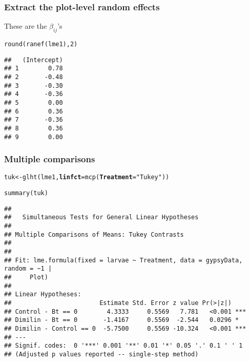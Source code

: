 \documentclass[color=usenames,dvipsnames]{beamer}\usepackage[]{graphicx}\usepackage[]{color}
\makeatletter
\newcommand{\hlnum}[1]{\textcolor[rgb]{0.69,0.494,0}{#1}}%
\newcommand{\hlstr}[1]{\textcolor[rgb]{0.749,0.012,0.012}{#1}}%
\newcommand{\hlstd}[1]{\textcolor[rgb]{0,0,0}{#1}}%
\newcommand{\hlkwb}[1]{\textcolor[rgb]{0,0.341,0.682}{#1}}%
\newcommand{\hlkwc}[1]{\textcolor[rgb]{0,0,0}{\textbf{#1}}}%
\newcommand{\hlkwd}[1]{\textcolor[rgb]{0.004,0.004,0.506}{#1}}%
\newenvironment{kframe}{%
 \def\at@end@of@kframe{}%
 \ifinner\ifhmode%
  \def\at@end@of@kframe{\end{minipage}}%
  \begin{minipage}{\columnwidth}%
 \fi\fi%
 \def\FrameCommand##1{\hskip\@totalleftmargin \hskip-\fboxsep
 \colorbox{shadecolor}{##1}\hskip-\fboxsep
     \hskip-\linewidth \hskip-\@totalleftmargin \hskip\columnwidth}%
 \MakeFramed {\advance\hsize-\width
   \@totalleftmargin\z@ \linewidth\hsize
   \@setminipage}}%
 {\par\unskip\endMakeFramed%
 \at@end@of@kframe}
\newenvironment{knitrout}{}{} %
\makeatother
\begin{document}
\begin{frame}[fragile]
  \frametitle{Extract the plot-level random effects}
  These are the $\beta_{ij}$'s
\begin{knitrout}
\color{fgcolor}\begin{kframe}
\begin{alltt}
\hlkwd{round}\hlstd{(}\hlkwd{ranef}\hlstd{(lme1),} \hlnum{2}\hlstd{)}
\end{alltt}
\begin{verbatim}
##   (Intercept)
## 1        0.78
## 2       -0.48
## 3       -0.30
## 4       -0.36
## 5        0.00
## 6        0.36
## 7       -0.36
## 8        0.36
## 9        0.00
\end{verbatim}
\end{kframe}
\end{knitrout}
\end{frame}



\begin{frame}[fragile]
  \frametitle{Multiple comparisons}
\begin{knitrout}\scriptsize
{}\color{fgcolor}\begin{kframe}
\begin{alltt}
\hlstd{tuk} \hlkwb{<-} \hlkwd{glht}\hlstd{(lme1,} \hlkwc{linfct}\hlstd{=}\hlkwd{mcp}\hlstd{(}\hlkwc{Treatment}\hlstd{=}\hlstr{"Tukey"}\hlstd{))}
\end{alltt}
\end{kframe}
\end{knitrout}
\pause
\begin{knitrout}\scriptsize
{}\color{fgcolor}\begin{kframe}
\begin{alltt}
\hlkwd{summary}\hlstd{(tuk)}
\end{alltt}
\begin{verbatim}
## 
## 	 Simultaneous Tests for General Linear Hypotheses
## 
## Multiple Comparisons of Means: Tukey Contrasts
## 
## 
## Fit: lme.formula(fixed = larvae ~ Treatment, data = gypsyData, random = ~1 | 
##     Plot)
## 
## Linear Hypotheses:
##                        Estimate Std. Error z value Pr(>|z|)    
## Control - Bt == 0        4.3333     0.5569   7.781   <0.001 ***
## Dimilin - Bt == 0       -1.4167     0.5569  -2.544   0.0296 *  
## Dimilin - Control == 0  -5.7500     0.5569 -10.324   <0.001 ***
## ---
## Signif. codes:  0 '***' 0.001 '**' 0.01 '*' 0.05 '.' 0.1 ' ' 1
## (Adjusted p values reported -- single-step method)
\end{verbatim}
\end{kframe}
\end{knitrout}
\end{frame}
\end{document}
